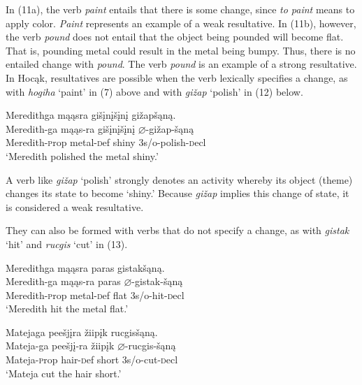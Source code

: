 \documentclass[output=paper]{LSP/langsci}
\begin{document}
In (11a), the verb \textit{paint} entails that there is some change, since \textit{to paint} means to apply color. \textit{Paint} represents an example of a weak resultative. In (11b), however, the verb \textit{pound} does not entail that the object being pounded will become flat. That is, pounding metal could result in the metal being bumpy. Thus, there is no entailed change with \textit{pound}. The verb \textit{pound} is an example of a strong resultative. In Hoc\k{a}k, resultatives are possible when the verb lexically specifies a change, as with \textit{hogiha} `paint' in (7) above and with \textit{gi\v{z}ap} `polish' in (12) below.

\begin{exe}

\ex \glll Meredithga m\k{a}\k{a}sra gi\v{s}\k{i}n\k{i}\v{s}\k{i}n\k{i} gi\v{z}ap\v{s}\k{a}n\k{a}.  \\
 Meredith-ga m\k{a}\k{a}s-ra gi\v{s}\k{i}n\k{i}\v{s}\k{i}n\k{i} $\varnothing$-gi\v{z}ap-\v{s}\k{a}n\k{a}\\
 Meredith-{\textsc prop} metal-{\textsc def} shiny {\textsc 3s/o}-polish-{\textsc decl}\\
\glt `Meredith polished the metal shiny.'

\end{exe}

A verb like \textit{gi\v{z}ap} `polish' strongly denotes an activity whereby its object (theme) changes its state to become `shiny.' Because \textit{gi\v{z}ap} implies this change of state, it is considered a weak resultative. 

They can also be formed with verbs that do not specify a change, as with \textit{gistak} `hit' and \textit{rucgis} `cut' in (13).

\begin{exe}
\ex
\begin{xlist}

\ex \glll Meredithga m\k{a}\k{a}sra paras gistak\v{s}\k{a}n\k{a}. \\
 Meredith-ga m\k{a}\k{a}s-ra paras $\varnothing$-gistak-\v{s}\k{a}n\k{a}\\
Meredith-{\textsc prop} metal-{\textsc def} flat {\textsc 3s/o}-hit-{\textsc decl}\\
\glt `Meredith hit the metal flat.'

\ex \glll Matejaga pee\v{s}j\k{i}ra \v{z}iip\k{i}k rucgis\v{s}\k{a}n\k{a}.\\
Mateja-ga pee\v{s}j\k{i}-ra \v{z}iip\k{i}k $\varnothing$-rucgis-\v{s}\k{a}n\k{a}\\
Mateja-{\textsc prop} hair-{\textsc def} short {\textsc 3s/o}-cut-{\textsc decl}\\
\glt `Mateja cut the hair short.'

\end{xlist}
\end{exe}
\end{document}
